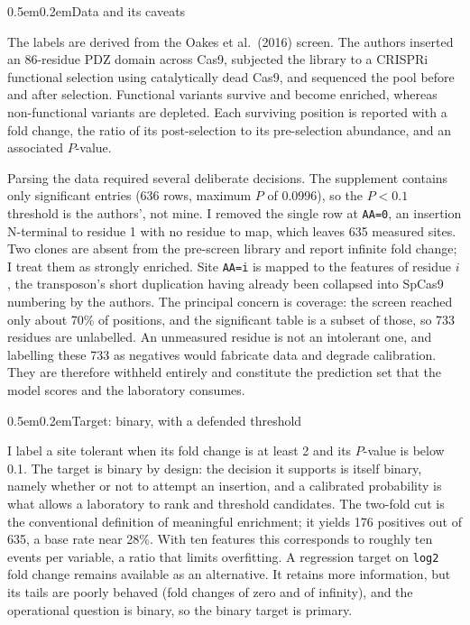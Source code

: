 \documentclass[10pt]{article}
\makeatletter
\renewcommand\section{\@startsection{section}{1}{0pt}%
  {0.5em}{0.2em}{\normalsize\bfseries}}
\makeatother
\begin{document}
\section{Data and its caveats}

The labels are derived from the Oakes et al.\ (2016) screen. The authors inserted an 86-residue
PDZ domain across Cas9, subjected the library to a CRISPRi functional selection using
catalytically dead Cas9, and sequenced the pool before and after selection. Functional variants
survive and become enriched, whereas non-functional variants are depleted. Each surviving position
is reported with a fold change, the ratio of its post-selection to its pre-selection abundance,
and an associated $P$-value.

Parsing the data required several deliberate decisions. The supplement contains only significant
entries (636 rows, maximum $P$ of 0.0996), so the $P<0.1$ threshold is the authors', not mine. I
removed the single row at \texttt{AA=0}, an insertion N-terminal to residue 1 with no residue to
map, which leaves 635 measured sites. Two clones are absent from the pre-screen library and report
infinite fold change; I treat them as strongly enriched. Site \texttt{AA=i} is mapped to the
features of residue $i$, the transposon's short duplication having already been collapsed into
SpCas9 numbering by the authors. The principal concern is coverage: the screen reached only about
70\% of positions, and the significant table is a subset of those, so 733 residues are unlabelled.
An unmeasured residue is not an intolerant one, and labelling these 733 as negatives would
fabricate data and degrade calibration. They are therefore withheld entirely and constitute the
prediction set that the model scores and the laboratory consumes.

\section{Target: binary, with a defended threshold}

I label a site tolerant when its fold change is at least 2 and its $P$-value is below 0.1. The
target is binary by design: the decision it supports is itself binary, namely whether or not to
attempt an insertion, and a calibrated probability is what allows a laboratory to rank and
threshold candidates. The two-fold cut is the conventional definition of meaningful enrichment; it
yields 176 positives out of 635, a base rate near 28\%. With ten features this corresponds to
roughly ten events per variable, a ratio that limits overfitting. A regression target on
\texttt{log2} fold change remains available as an alternative. It retains more information, but its
tails are poorly behaved (fold changes of zero and of infinity), and the operational question is
binary, so the binary target is primary.
\end{document}
